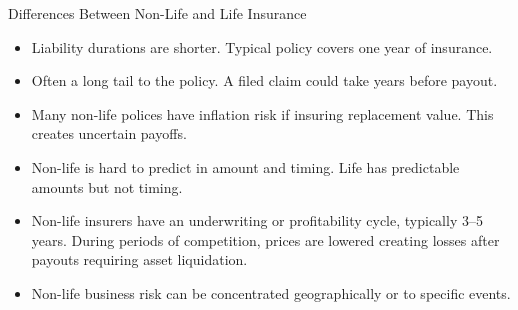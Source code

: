 \documentclass[../custom]{flashcards}
\begin{document}
\begin{flashcard}[\studyArea]{Differences Between Non-Life and Life Insurance}
    \begin{itemize}
        \item Liability durations are shorter. Typical policy covers one year of insurance.
        \item Often a long tail to the policy. A filed claim could take years before payout.
        \item Many non-life polices have inflation risk if insuring replacement value. This creates uncertain payoffs.
        \item Non-life is hard to predict in amount and timing. Life has predictable amounts but not timing.
        \item Non-life insurers have an underwriting or profitability cycle, typically 3--5 years. During periods of competition, prices are lowered creating losses after payouts requiring asset liquidation.
        \item Non-life business risk can be concentrated geographically or to specific events.
    \end{itemize}
\end{flashcard}
\end{document}
